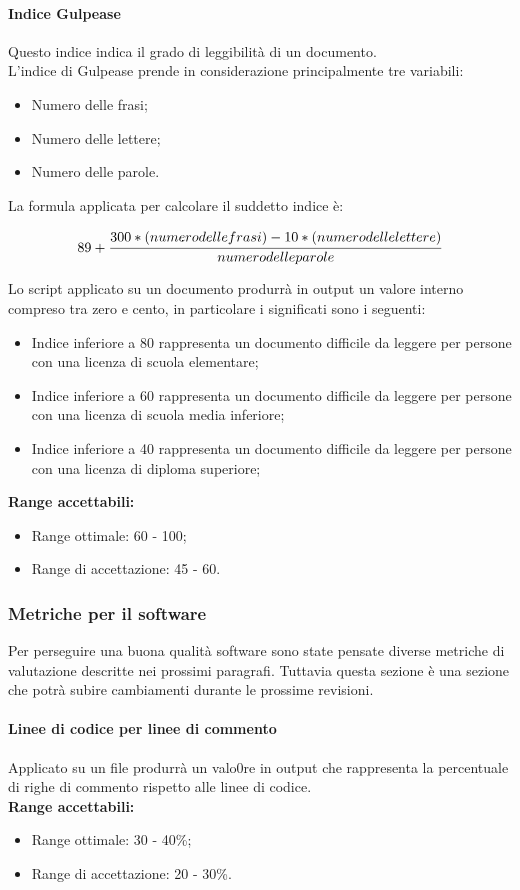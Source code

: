 \documentclass{scalatekids-article}
\begin{document}
\paragraph{Indice Gulpease}
\label{par:metricheGulpease}
Questo indice indica il grado di leggibilità di un documento.\\L'indice di Gulpease prende in considerazione principalmente tre variabili:
\begin{itemize}
\item Numero delle frasi;
\item Numero delle lettere;
\item Numero delle parole.
\end{itemize}
La formula applicata per calcolare il suddetto indice è:
\begin{center}
\begin{equation}
  89 + \cfrac{300 * (numero delle frasi) - 10 * (numero delle lettere)}{numero delle parole}
\end{equation}
\end{center}
Lo script applicato su un documento produrrà in output un valore interno compreso tra zero e cento, in particolare i significati sono i seguenti:
\begin{itemize}
  \item Indice inferiore a 80 rappresenta un documento difficile da leggere per persone con una licenza di scuola elementare;
  \item Indice inferiore a 60 rappresenta un documento difficile da leggere per persone con una licenza di scuola media inferiore;
  \item Indice inferiore a 40 rappresenta un documento difficile da leggere per persone con una licenza di diploma superiore;
\end{itemize}
\textbf{Range accettabili:}
\begin{itemize}
  \item Range ottimale: 60 - 100;
  \item Range di accettazione: 45 - 60.
\end{itemize}
\subsubsection{Metriche per il software}
Per perseguire una buona qualità software sono state pensate diverse metriche di valutazione descritte nei prossimi paragrafi. Tuttavia questa sezione è una sezione che potrà subire cambiamenti durante le prossime revisioni.
\paragraph{Linee di codice per linee di commento}
Applicato su un file produrrà un valo0re in output che rappresenta la percentuale di righe di commento rispetto alle linee di codice.\\ 
\textbf{Range accettabili:}
\begin{itemize}
  \item Range ottimale: 30 - 40\%;
  \item Range di accettazione: 20 - 30\%.
\end{itemize}
\end{document}
